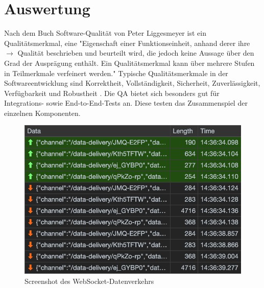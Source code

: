 \chapter{Auswertung}
\label{chap:auswertung}

Nach dem Buch Software-Qualität von Peter Liggesmeyer
ist ein Qualitätsmerkmal, eine "Eigenschaft einer Funktionseinheit, anhand derer ihre \(\rightarrow\)
Qualität beschrieben und beurteilt wird, die jedoch keine Aussage über
den Grad der Ausprägung enthält. Ein Qualitätsmerkmal kann über mehrere Stufen in Teilmerkmale
verfeinert werden."\cite[S. 515]{SoftwareQualitaet} Typische Qualitätsmerkmale in der Softwareentwicklung
sind Korrektheit, Vollständigkeit, Sicherheit, Zuverlässigkeit, Verfügbarkeit und Robustheit \cite[S. 5]{SoftwareQualitaet}.
Die QA bietet sich besonders gut für Integrations- sowie End-to-End-Tests an. Diese testen
das Zusammenspiel der einzelnen Komponenten.



\begin{figure}
    \label{figure:screenshotdeswebsocketdatenverkehrs}
    \begin{center}
    \includegraphics[scale=0.65]{img/screenshots/WebSocketTraffic}
    \end{center}
    \caption{Screenshot des WebSocket-Datenverkehrs}
\end{figure}

